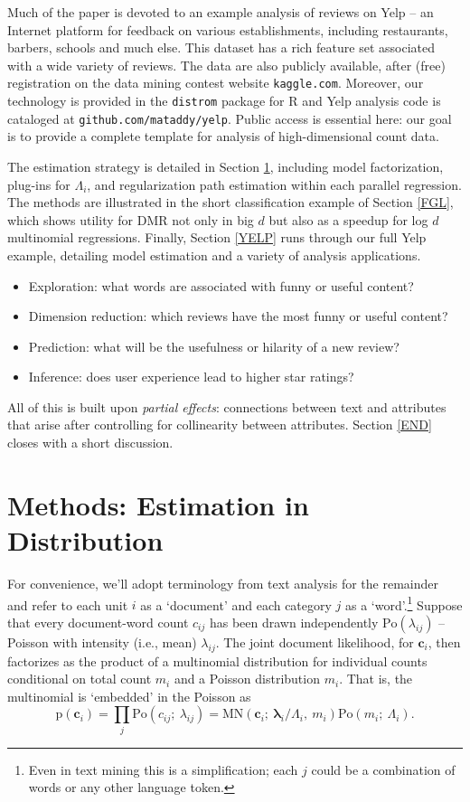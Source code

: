 \documentclass[12pt]{article}
\newcommand{\sgl}{\setstretch{1.1}}
\newcommand{\bs}[1]{\boldsymbol{#1}}
\newcommand{\mr}[1]{\mathrm{#1}}
\newcommand{\bm}[1]{\mathbf{#1}}
\newcommand{\cd}[1]{{\tt#1}}
\begin{document}
Much of the paper is devoted to an example analysis of reviews on Yelp -- an
Internet platform for feedback on various establishments, including
restaurants, barbers, schools and much else.  This dataset has a rich feature
set associated with a wide variety of reviews. The data are also publicly
available, after (free) registration on the data mining contest website
\cd{kaggle.com}. 
Moreover, our technology is provided in the \cd{distrom} package for R and
 Yelp analysis code is cataloged at \cd{github.com/mataddy/yelp}.  Public
access is essential here: our goal is to provide a
complete template for analysis of high-dimensional count data.

The estimation strategy is detailed in Section \ref{methods}, including model
factorization, plug-ins for $\Lambda_i$, and regularization
path estimation within each parallel regression. The methods
are illustrated in the short classification example of Section
\ref{FGL}, which shows utility for DMR not only in
big $d$ but also as a speedup for log $d$ multinomial regressions. Finally,
Section \ref{YELP} runs through our full Yelp example, detailing model
estimation and a variety of analysis applications.
\begin{itemize}\sgl
\item 
Exploration: what words are associated with funny or useful content?
\item Dimension reduction: which reviews have the most funny or useful content?
\item Prediction: what will be the usefulness or hilarity of a new review? 
\item Inference: does user experience lead to higher star ratings?
\end{itemize}
All of this is built upon {\it partial effects}:  connections
between text and attributes that arise  after controlling for
collinearity between attributes.  Section \ref{END} closes with a short
discussion.


\section{Methods: Estimation in Distribution}
\label{methods}

For convenience, we'll adopt terminology from text analysis for the remainder
and refer to each unit $i$ as a `document' and each category $j$ as a
`word'.\footnote{Even in text mining this is a simplification; each $j$ could
be a combination of words or any other language token.} Suppose that every
document-word count $c_{ij}$ has been drawn independently
$\mr{Po}\left(\lambda_{ij}\right)$ -- Poisson with intensity (i.e., mean)
$\lambda_{ij}$. The joint document likelihood, for $\bm{c}_i$, then factorizes as the
product of a multinomial distribution for  individual counts conditional on
 total count $m_i$ and a Poisson distribution $m_i$.
That is, the multinomial is `embedded' in the Poisson as
\begin{equation}\label{embed} \mr{p}(\bm{c}_{i}) = \prod_j
\mr{Po}\left(c_{ij};~\lambda_{ij}\right) =
\mr{MN}\left(\bm{c}_i;~\bs{\lambda}_{i}/\Lambda_i,
~m_i\right)\mr{Po}\left(m_i;~\Lambda_i\right). 
\end{equation}
\end{document}
